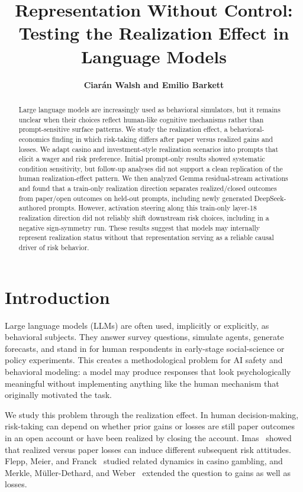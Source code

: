 \documentclass[final]{sparreport}
\title{Representation Without Control: Testing the Realization Effect in Language Models}
\author{
  \textbf{Ciar\'an Walsh and Emilio Barkett}
}
\begin{document}
\maketitle

\begin{abstract}
Large language models are increasingly used as behavioral simulators, but it remains unclear when their choices reflect human-like cognitive mechanisms rather than prompt-sensitive surface patterns. We study the realization effect, a behavioral-economics finding in which risk-taking differs after paper versus realized gains and losses. We adapt casino and investment-style realization scenarios into prompts that elicit a wager and risk preference. Initial prompt-only results showed systematic condition sensitivity, but follow-up analyses did not support a clean replication of the human realization-effect pattern. We then analyzed Gemma residual-stream activations and found that a train-only realization direction separates realized/closed outcomes from paper/open outcomes on held-out prompts, including newly generated DeepSeek-authored prompts. However, activation steering along this train-only layer-18 realization direction did not reliably shift downstream risk choices, including in a negative sign-symmetry run. These results suggest that models may internally represent realization status without that representation serving as a reliable causal driver of risk behavior.
\end{abstract}


\section{Introduction}

Large language models (LLMs) are often used, implicitly or explicitly, as behavioral subjects. They answer survey questions, simulate agents, generate forecasts, and stand in for human respondents in early-stage social-science or policy experiments. This creates a methodological problem for AI safety and behavioral modeling: a model may produce responses that look psychologically meaningful without implementing anything like the human mechanism that originally motivated the task.

We study this problem through the realization effect. In human decision-making, risk-taking can depend on whether prior gains or losses are still paper outcomes in an open account or have been realized by closing the account. Imas~\cite{imas2016realization} showed that realized versus paper losses can induce different subsequent risk attitudes. Flepp, Meier, and Franck~\cite{flepp2021paper} studied related dynamics in casino gambling, and Merkle, M{\"u}ller-Dethard, and Weber~\cite{merkle2021closing} extended the question to gains as well as losses.
\end{document}
